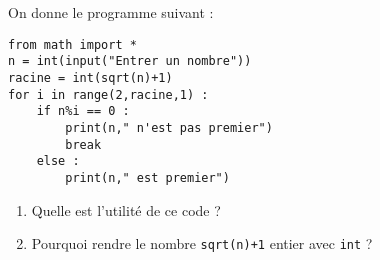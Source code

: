 
On donne le programme suivant :

\begin{lstlisting}
from math import *
n = int(input("Entrer un nombre"))
racine = int(sqrt(n)+1)
for i in range(2,racine,1) :
	if n%i == 0 :
		print(n," n'est pas premier")
		break
	else :
		print(n," est premier")
\end{lstlisting}

\begin{enumerate}
\item Quelle est l'utilité de ce code ?
\item Pourquoi rendre le nombre \texttt{sqrt(n)+1} entier avec \texttt{int} ?
\end{enumerate}
